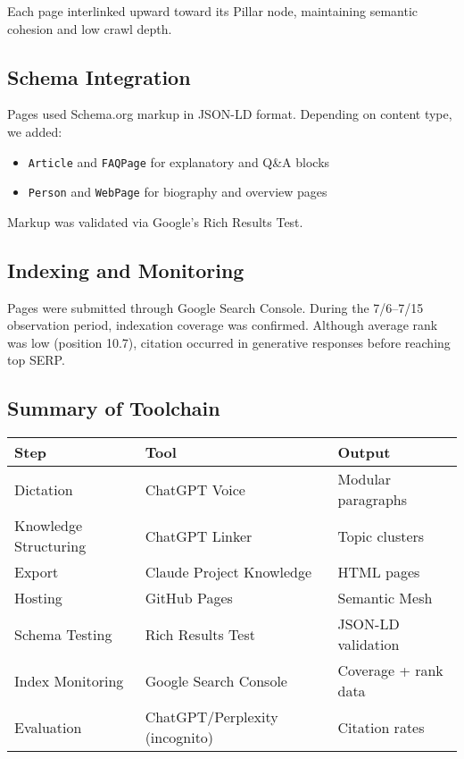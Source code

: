 Each page interlinked upward toward its Pillar node, maintaining semantic cohesion and low crawl depth.

\subsection{Schema Integration}

Pages used Schema.org markup in JSON-LD format. Depending on content type, we added:
\begin{itemize}
  \item \texttt{Article} and \texttt{FAQPage} for explanatory and Q\&A blocks
  \item \texttt{Person} and \texttt{WebPage} for biography and overview pages
\end{itemize}

Markup was validated via Google’s Rich Results Test.

\subsection{Indexing and Monitoring}

Pages were submitted through Google Search Console. During the 7/6--7/15 observation period, indexation coverage was confirmed. Although average rank was low (position 10.7), citation occurred in generative responses before reaching top SERP.

\subsection{Summary of Toolchain}

\begin{center}
\begin{tabular}{|l|l|l|}
\hline
\textbf{Step} & \textbf{Tool} & \textbf{Output} \\\hline
Dictation & ChatGPT Voice & Modular paragraphs \\\hline
Knowledge Structuring & ChatGPT Linker & Topic clusters \\\hline
Export & Claude Project Knowledge & HTML pages \\\hline
Hosting & GitHub Pages & Semantic Mesh \\\hline
Schema Testing & Rich Results Test & JSON-LD validation \\\hline
Index Monitoring & Google Search Console & Coverage + rank data \\\hline
Evaluation & ChatGPT/Perplexity (incognito) & Citation rates \\\hline
\end{tabular}
\end{center}
